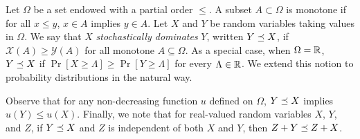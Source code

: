 \begin{definition}\label{def:dominance}
  Let $\Omega$ be a set endowed with a partial order $\leq$. A subset
  $A \subset \Omega$ is monotone if for all $x \leq y$, $x \in A$
  implies $y \in A$.  Let $X$ and $Y$ be random variables taking
  values in $\Omega$.
  We say that $X$ \emph{stochastically dominates} $Y$, 
  written $Y \preceq X$, if 
  $
    \mathcal{X}(A) \geq \mathcal{Y}(A)
    $ for all monotone $A \subseteq \Omega$.  As a special case, when
    $\Omega = \mathbb{R}$, $Y \preceq X$ if
    $\Pr[X \geq \Lambda] \geq \Pr[Y \geq \Lambda]$ for every
    $\Lambda \in \mathbb{R}$.  We extend this notion to probability
    distributions in the natural way.
\end{definition}
Observe that for any non-decreasing function $u$ defined on $\Omega$,
$Y \preceq X$ implies $u(Y) \leq u(X)$. Finally, we note that for
real-valued random variables $X$, $Y$, and $Z$, if $Y \preceq X$
and $Z$ is independent of both $X$ and $Y$, then
$Z + Y \preceq Z + X$.



